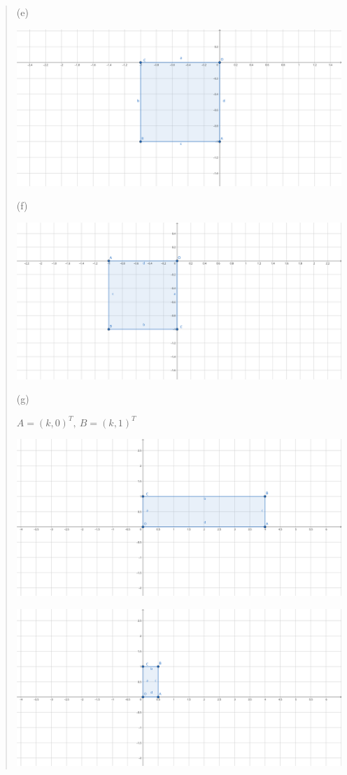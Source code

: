 \documentclass{article}
\begin{document}
\begin{quote}
    (e)
    
    \includegraphics[width=0.75\linewidth]{geogebra-export(4).png}

    (f)

    \includegraphics[width=0.75\linewidth]{geogebra-export(5).png}

    (g)

    $A = (k, 0)^T, \ B = (k, 1)^T$
    
    \includegraphics[width=0.75\linewidth]{geogebra-export(6).png}

    \includegraphics[width=0.75\linewidth]{geogebra-export(7).png}


\end{quote}
\end{document}
